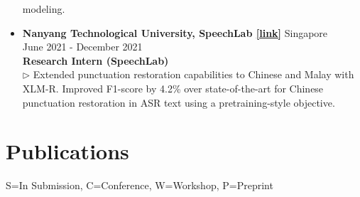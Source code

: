 \documentclass[11pt,letterpaper]{article}
\begin{document}
\begin{itemize}[leftmargin=*,label={},itemsep=4pt]
                modeling.\\
        \item \textbf{Nanyang Technological University, SpeechLab  \href{https://www.ntu.edu.sg/speechlab}{[link]}} \hfill Singapore\\
            \hfill June 2021 - December 2021\\
            \textbf{\textit{} Research Intern (SpeechLab)}\\
            $\triangleright$ Extended punctuation restoration capabilities to Chinese and Malay with XLM-R.
                Improved F1-score by 4.2\% over state-of-the-art for Chinese punctuation restoration in ASR text using a
                pretraining-style objective.\\
    \end{itemize}
    
    \section*{Publications}
    \small{S=In Submission, C=Conference, W=Workshop, P=Preprint}
    
\end{document}
